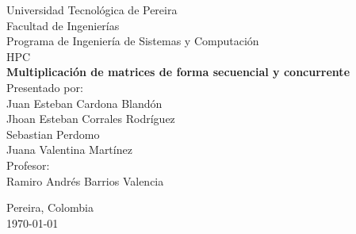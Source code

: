 \begin{titlepage}
    \centering
    \vspace*{0.5cm}
    
    {\Large Universidad Tecnológica de Pereira}\\[0.5cm]
    {\large Facultad de Ingenierías}\\[0.3cm]
    {\large Programa de Ingeniería de Sistemas y Computación}\\[0.3cm]
    {\large HPC}\\[3cm]
    
    {\LARGE\textbf{Multiplicación de matrices de forma secuencial y concurrente}}\\[2cm]
        
    {\large Presentado por:}\\[0.3cm]
    {\large Juan Esteban Cardona Blandón}\\[0.3cm]
    {\large Jhoan Esteban Corrales Rodríguez}\\[0.3cm]
    {\large Sebastian Perdomo}\\[0.3cm]
    {\large Juana Valentina Martínez}\\[1cm]
    {\large Profesor:}\\[0.3cm]
    {\large Ramiro Andrés Barrios Valencia}\\[0.3cm]
        
    \vfill
    
    {\large Pereira, Colombia}\\[0.3cm]
    {\large \today}
    
\end{titlepage}